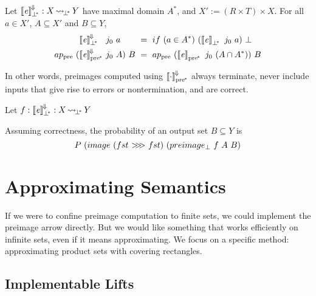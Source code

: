 \documentclass{llncs}
\newcommand{\arrow}{\rightsquigarrow}
\newcommand{\conv}{^{\mspace{-2mu}\Downarrow\mspace{-2mu}}}
\newcommand{\meaningofconv}[1]{\left\llbracket{#1}\right\rrbracket\conv}
\newcommand{\arrowcomp}{\ensuremath{{>}\mspace{-6mu}{>}\mspace{-6mu}{>}}}
\newcommand{\pre}{_\mathrm{pre}}
\newcommand{\pbot}{{\bot^{\mspace{-4mu}*}}}
\DeclareMathOperator{\pbotto}{\arrow_{\mspace{-3mu}\pbot}}
\newcommand{\ppre}{_\mathrm{pre^{\mspace{-2mu}*}}}
\begin{document}
\begin{theorem}
\label{thm:correct-convergence}
Let $\meaningofconv{\mathit{e}}_\pbot : X \pbotto Y$ have maximal domain $A^*$, and $X' := (R \times T) \times X$.
For all $a \in X'$, $A \subseteq X'$ and $B \subseteq Y$,
\begin{equation}
\begin{aligned}
	&\meaningofconv{\mathit{e}}_\pbot &&\!\!\!\!j_0~a &&\!\!\!\!= \ if~(a \in A^*)~(\meaningof{\mathit{e}}_\pbot~j_0~a)~\bot \\
	ap\pre~(\!&\meaningofconv{\mathit{e}}\ppre &&\!\!\!\!j_0~A)~B &&\!\!\!\!= \ ap\pre~(\meaningof{\mathit{e}}\ppre~j_0~(A \i A^*))~B
\end{aligned}
\end{equation}
\end{theorem}

In other words, preimages computed using $\meaningofconv{\cdot}\ppre$ always terminate, never include inputs that give rise to errors or nontermination, and are correct.

Let $f : \meaningofconv{\mathit{e}}_\pbot : X \pbotto Y$

Assuming correctness, the probability of an output set $B \subseteq Y$ is
\begin{equation}
	P~(image~(fst~\arrowcomp~fst)~(preimage_\bot~f~A~B)
\end{equation}


\section{Approximating Semantics}
\label{sec:approximating-semantics}

If we were to confine preimage computation to finite sets, we could implement the preimage arrow directly.
But we would like something that works efficiently on infinite sets, even if it means approximating.
We focus on a specific method: approximating product sets with covering rectangles.

\subsection{Implementable Lifts}
\end{document}
